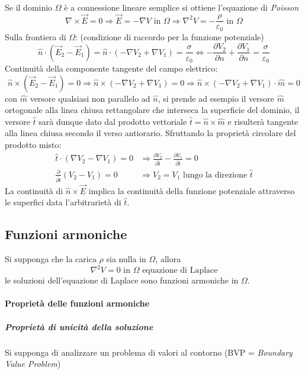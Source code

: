Se il dominio $\Omega$ è a connessione lineare semplice si ottiene l'equazione di \textit{Poisson}
$$
\nabla\times\vec{E} = 0 \Rightarrow \vec{E} = - \nabla V \text{ in } \Omega \Rightarrow \nabla^2V = -\frac{\rho}{\varepsilon_0} \text{ in } \Omega
$$
Sulla frontiera di $\Omega$: (condizione di raccordo per la funzione potenziale)
$$
\hat{n}\cdot (\vec{E}_2 - \vec{E}_1) = \hat{n}\cdot\left(-\nabla V_2 + \nabla V_1\right) =
\frac{\sigma}{\varepsilon_0} \Leftrightarrow
-\frac{\partial V_2}{\partial n} + \frac{\partial V_1}{\partial n} = \frac{\sigma}{\varepsilon_0}
$$
Continuità della componente tangente del campo elettrico:
$$
\hat{n}\times\left(\vec{E}_2-\vec{E}_1\right) = 0 \Rightarrow \hat{n}\times\left(-\nabla V_2 + \nabla V_1\right) = 0 \Rightarrow \hat{n}\times\left(-\nabla V_2 + \nabla V_1\right)\cdot\hat{m} = 0
$$
con $\hat{m}$ versore qualsiasi non parallelo ad $\hat{n}$, si prende ad esempio il versore $\hat{m}$
ortogonale alla linea chiusa rettangolare che interseca la superficie del dominio, 
il versore $\hat{t}$ sarà dunque dato dal prodotto vettoriale $\hat{t} = \hat{n}\times\hat{m}$ 
e risulterà tangente alla linea chiusa secondo il verso antiorario.
Sfruttando la proprietà circolare del prodotto misto:
$$
\begin{aligned}
\hat{t}\cdot\left(\nabla V_2 - \nabla V_1\right)  = 0 &\Rightarrow \frac{\partial V_2}{\partial \hat{t}} - \frac{\partial V_1}{\partial \hat{t}} = 0 \\
\frac{\partial}{\partial \hat{t}}(V_2-V_1)  = 0 &\Rightarrow V_2 = V_1
\text{ lungo la direzione }\hat{t}
\end{aligned}
$$
La continuità di $\hat{n}\times\vec{E}$ implica la continuità della funzione potenziale attraverso le superfici data l'arbitrarietà di $\hat{t}$.

\subsection{Funzioni armoniche}
Si supponga che la carica $\rho$ sia nulla in $\Omega$, allora
$$
\nabla^2 V = 0 \text{ in } \Omega \text{ equazione di Laplace}
$$
le soluzioni dell'equazione di Laplace sono funzioni armoniche in $\Omega$.

\paragraph{Proprietà delle funzioni armoniche}
\subparagraph{Proprietà di unicità della soluzione}
Si supponga di analizzare un problema di valori al contorno (BVP = \textit{Boundary Value Problem})


